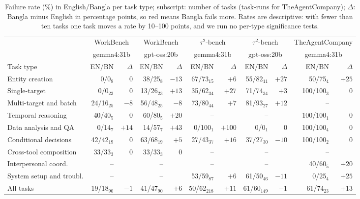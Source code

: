 \documentclass[11pt]{article}
\newcommand{\dn}[1]{\textcolor{red!70!black}{#1}}
\newcommand{\up}[1]{\textcolor{green!45!black}{#1}}
\begin{document}
\begin{table}[t]
\centering\footnotesize
\setlength{\tabcolsep}{2.9pt}
\begin{tabular}{l rr rr rr rr rr}
\toprule
 & \multicolumn{2}{c}{WorkBench} & \multicolumn{2}{c}{WorkBench}
 & \multicolumn{2}{c}{$\tau^2$-bench} & \multicolumn{2}{c}{$\tau^2$-bench}
 & \multicolumn{2}{c}{TheAgentCompany} \\
 & \multicolumn{2}{c}{gemma4:31b} & \multicolumn{2}{c}{gpt-oss:20b}
 & \multicolumn{2}{c}{gemma4:31b} & \multicolumn{2}{c}{gpt-oss:20b}
 & \multicolumn{2}{c}{gemma4:31b} \\
\cmidrule(lr){2-3}\cmidrule(lr){4-5}\cmidrule(lr){6-7}\cmidrule(lr){8-9}\cmidrule(lr){10-11}
Task type & EN/BN & $\Delta$ & EN/BN & $\Delta$ & EN/BN & $\Delta$ & EN/BN & $\Delta$ & EN/BN & $\Delta$ \\
\midrule
Entity creation          & 0/0$_{8}$   & 0           & 38/25$_{8}$  & \up{$-13$} & 67/73$_{15}$ & \dn{$+6$}   & 55/82$_{11}$ & \dn{$+27$} & 50/75$_{4}$   & \dn{$+25$} \\
Single-target            & 0/0$_{23}$  & 0           & 13/26$_{23}$ & \dn{$+13$} & 35/62$_{34}$ & \dn{$+27$}  & 71/74$_{34}$ & \dn{$+3$}  & 100/100$_{3}$ & 0 \\
Multi-target and batch   & 24/16$_{25}$ & \up{$-8$}  & 56/48$_{25}$ & \up{$-8$}  & 73/80$_{44}$ & \dn{$+7$}   & 81/93$_{27}$ & \dn{$+12$} & -- & \\
Temporal reasoning       & 40/40$_{5}$ & 0           & 60/80$_{5}$  & \dn{$+20$} & -- &              & -- &            & 100/100$_{1}$ & 0 \\
Data analysis and QA     & 0/14$_{7}$  & \dn{$+14$}  & 14/57$_{7}$  & \dn{$+43$} & 0/100$_{1}$  & \dn{$+100$} & 0/0$_{1}$    & 0          & 100/100$_{4}$ & 0 \\
Conditional decisions    & 42/42$_{19}$ & 0          & 63/68$_{19}$ & \dn{$+5$}  & 27/43$_{37}$ & \dn{$+16$}  & 37/27$_{30}$ & \up{$-10$} & 100/100$_{2}$ & 0 \\
Cross-tool composition   & 33/33$_{3}$ & 0           & 33/33$_{3}$  & 0          & -- &              & -- &            & -- & \\
Interpersonal coord.     & -- &                      & -- &                    & -- &              & -- &            & 40/60$_{5}$   & \dn{$+20$} \\
System setup and troubl. & -- &                      & -- &                    & 53/59$_{87}$ & \dn{$+6$}   & 61/50$_{46}$ & \up{$-11$} & 0/25$_{4}$    & \dn{$+25$} \\
\midrule
All tasks                & 19/18$_{90}$ & \up{$-1$}  & 41/47$_{90}$ & \dn{$+6$}  & 50/62$_{218}$ & \dn{$+11$} & 61/60$_{149}$ & \up{$-1$} & 61/74$_{23}$ & \dn{$+13$} \\
\bottomrule
\end{tabular}
\caption{Failure rate (\%) in English/Bangla per task type; subscript: number of tasks
(task-runs for TheAgentCompany); $\Delta$: Bangla minus English in percentage points, so
\dn{red} means Bangla fails more. Rates are descriptive: with fewer than ten tasks one task
moves a rate by 10--100 points, and we run no per-type significance tests.}
\label{tab:percat}
\end{table}
\end{document}
